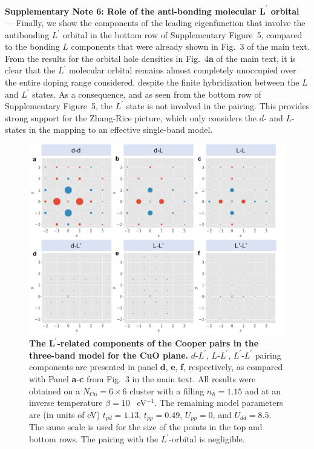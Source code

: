 \documentclass[11pt,superscriptaddress,floatfix,notitlepage]{revtex4-1}
\begin{document}
\noindent\textbf{Supplementary Note 6: Role of the anti-bonding molecular $\mathbf{L^\prime}$ orbital} --- 
Finally, we show the components of the leading eigenfunction that involve the antibonding $L^\prime$ orbital in the bottom row of Supplementary Figure~5, compared to the bonding $L$ components that were already shown in Fig.~3 of the main text. From the results for the orbital hole densities in Fig.~4{\bf a} of the main text, it is clear that the $L^\prime$ molecular orbital remains almost completely unoccupied over the entire doping range considered, despite the finite hybridization between the $L$ and $L^\prime$ states. As a consequence, and as seen from the bottom row of Supplementary Figure~5, the $L^\prime$ state is not involved in the pairing. This provides strong support for the Zhang-Rice picture, which only considers the $d$- and $L$-states in the mapping to an effective single-band model. 

\begin{figure}[ht]
\centering
\includegraphics[width=\linewidth]{./Figures/Lbar.pdf}
\caption{\textbf{The $\mathbf{L^\prime}$-related components of the Cooper pairs in the three-band model for the CuO plane.} $d$-$L^\prime$, $L$-$L^\prime$, $L^\prime$-$L^\prime$ pairing components are presented in panel {\bf d}, {\bf e}, {\bf f}, respectively, as compared with Panel {\bf a}-{\bf c} from Fig.~3 in the main text. All results were obtained  on a $N_\text{Cu} = 6\times6$ cluster with a filling $n_h=1.15$ and at an inverse temperature $\beta=10$ ~eV$^{-1}$. The remaining model parameters are (in units of eV) $t_{pd}=1.13$, $t_{pp}=0.49$, $U_{pp} = 0$, and $U_{dd}=8.5$. The same scale is used for the size of the points in the top and bottom rows. The pairing with the $L^\prime$-orbital is negligible.}
\label{Fig:weightvsdelta}
\end{figure}
\end{document}
